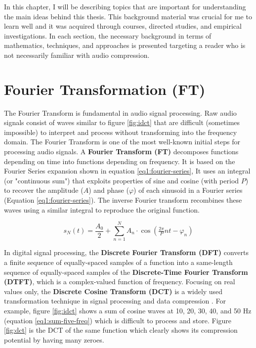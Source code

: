 \label{chapter:background}

In this chapter, I will be describing topics that are 
important for understanding the main ideas behind this thesis. This background material was crucial for me 
to learn well and it was acquired through courses, 
directed studies, and empirical investigations. In each section, the necessary background in terms of mathematics, techniques, and approaches is presented targeting a reader 
who is not necessarily familiar with audio compression. 


\section{Fourier Transformation (FT)}
\label{sec:fourier}

The Fourier Transform is fundamental in audio signal processing. Raw audio signals consist of waves similar to figure \ref{fig:idct} that are difficult (sometimes impossible) to interpret and process without transforming into the frequency domain. The Fourier Transform is one of the most well-known initial steps for processing audio signals. A \textbf{Fourier Transform (FT)} decomposes functions depending on time into functions depending on frequency. It is based on the Fourier Series expansion shown in equation \ref{eq1:fourier-series}, It uses an integral (or "continuous sum") that exploits properties of sine and cosine (with period $P$) to recover the amplitude ($A$) and phase ($\varphi$) of each sinusoid in a Fourier series (Equation \ref{eq1:fourier-series}). The inverse Fourier transform recombines these waves using a similar integral to reproduce the original function.

\begin{equation}
\label{eq1:fourier-series}
s_{\scriptscriptstyle N}(t)={\frac {A_{0}}{2}}+\sum _{n=1}^{N}A_{n}\cdot \cos \left({\tfrac {2\pi }{P}}nt-\varphi _{n}\right)
\end{equation}

In digital signal processing, the \textbf{Discrete Fourier Transform (DFT)} converts a finite sequence of equally-spaced samples of a function into a same-length sequence of equally-spaced samples of the \textbf{Discrete-Time Fourier Transform (DTFT)}, which is a complex-valued function of frequency. Focusing on real values only, the \textbf{Discrete Cosine Transform (DCT)} is a widely used transformation technique in signal processing and data compression \cite{Ahmed1974DCT}. For example, figure \ref{fig:idct} shows a sum of cosine waves at 10, 20, 30, 40, and 50 Hz (equation \ref{eq1:sum-five-freq}) which is difficult to process and store. Figure \ref{fig:dct} is the DCT of the same function which clearly shows its compression potential by having many zeroes.

